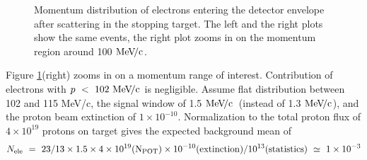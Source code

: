 \documentclass[12pt]{article}
\newcommand {\MeVc}       {\mbox{$\rm MeV\!/c$}}
\begin{document}
\begin{figure}[H]
  \hspace{-0.5in}
  \caption{
    \label{fig:bmum0s56b0_spmc_1_mom}
    Momentum distribution of electrons entering the detector envelope
    after scattering in the stopping target.
    The left and the right plots show the same events, the right plot zooms
    in on the momentum region around 100 \MeVc.
  }
\end{figure}

Figure \ref{fig:bmum0s56b0_spmc_1_mom}(right) zooms in on a momentum range of interest.
Contribution of electrons with $p ~<~ 102 ~\MeVc$ is negligible. 
Assume flat distribution between 102 and 115 MeV/c, the signal window of 1.5 \MeVc\ (instead of 1.3 \MeVc),
and the proton beam extinction of $1 \times 10^{-10}$. Normalization to the total proton flux
of $4 \times 10^{19}$ protons on target gives the expected background mean of 
$$
    N_{\rm ele} ~=~ 23/13 \times 1.5 \times 4 \times 10^{19} ({\rm N_{POT}}) \times 10^{-10}  ({\rm extinction}) / 10^{13} ({\rm statistics}) ~\simeq ~ 1 \times 10^{-3}
$$
\end{document}
